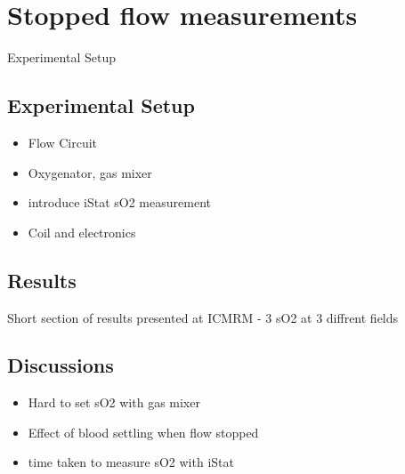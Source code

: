 \chapter{Stopped flow \SOtwo measurements}\label{ch:stoppedflow}

Experimental Setup

\section{Experimental Setup}

\begin{itemize}
\item Flow Circuit
\item Oxygenator, gas mixer
\item introduce iStat sO2 measurement
\item Coil and electronics
\end{itemize}

\section{Results}
Short section of results presented at ICMRM - 3 sO2 at 3 diffrent fields
\section{Discussions}

\begin{itemize}
\item Hard to set sO2 with gas mixer
\item Effect of blood settling when flow stopped
\item time taken to measure sO2 with iStat
\end{itemize}
